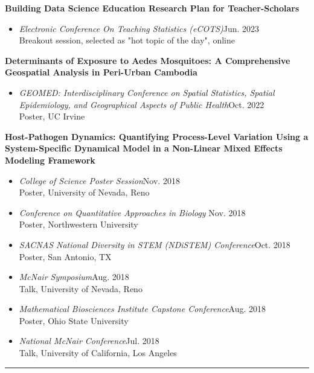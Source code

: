 \documentclass{article}
\begin{document}
\begin{description}
		\textbf{Building Data Science Education Research Plan for Teacher-Scholars}
		\begin{itemize}
			\item \textit{Electronic Conference On Teaching Statistics (eCOTS)}\hfill{Jun. 2023}\\
			Breakout session, selected as "hot topic of the day", online
		\end{itemize}
		
		\textbf{Determinants of Exposure to Aedes Mosquitoes: A Comprehensive Geospatial Analysis in Peri-Urban Cambodia}
		\begin{itemize}
			\item \textit{GEOMED: Interdisciplinary Conference on Spatial Statistics, Spatial Epidemiology, and Geographical Aspects of Public Health}\hfill{Oct. 2022}\\
			Poster, UC Irvine
		\end{itemize}
		
		\textbf{Host-Pathogen Dynamics: Quantifying Process-Level Variation Using a System-Specific Dynamical Model in a Non-Linear Mixed Effects Modeling Framework}
		\begin{itemize}
			\item \textit{College of Science Poster Session}\hfill{Nov. 2018}\\
			Poster, University of Nevada, Reno 
			
			\item \textit{Conference on Quantitative Approaches in Biology} \hfill{Nov. 2018}\\
			Poster, Northwestern University 
			
			\item \textit{SACNAS National Diversity in STEM (NDiSTEM) Conference}\hfill{Oct. 2018}\\ 
			Poster, San Antonio, TX
			
			\item \textit{McNair Symposium}\hfill{Aug. 2018}\\
			Talk, University of Nevada, Reno 
			
			\item \textit{Mathematical Biosciences Institute Capstone Conference}\hfill{Aug. 2018}\\
			Poster, Ohio State University
			
			\item \textit{National McNair Conference}\hfill{Jul. 2018}\\
			Talk, University of California, Los Angeles
		\end{itemize}
		
	\end{description}
	\vspace{-2mm}
	\rule{\linewidth}{1pt}
	
\end{document}
